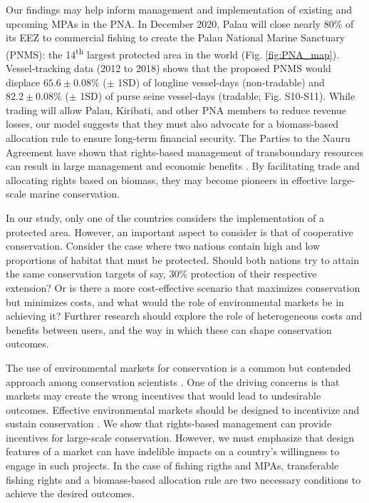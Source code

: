 \documentclass[12pt]{article}
\begin{document}
Our findings may help inform management and implementation of existing and upcoming MPAs in the PNA. In December 2020, Palau will close nearly 80\% of its EEZ to commercial fishing to create the Palau National Marine Sanctuary (PNMS): the 14\textsuperscript{th} largest protected area in the world (Fig. \ref{fig:PNA_map}). Vessel-tracking data (2012 to 2018) shows that the proposed PNMS would displace $65.6 \pm 0.08$\% ($\pm$ 1SD) of longline vessel-days (non-tradable) and $82.2 \pm 0.08$\% ($\pm$ 1SD) of purse seine vessel-days (tradable; Fig. S10-S11). While trading will allow Palau, Kiribati, and other PNA members to reduce revenue losses, our model suggests that they must also advocate for a biomass-based allocation rule to ensure long-term financial security. The Parties to the Nauru Agreement have shown that rights-based management of transboundary resources can result in large management and economic benefits \cite{havice_2013,aqorau_2018}. By facilitating trade and allocating rights based on biomass, they may become pioneers in effective large-scale marine conservation.

In our study, only one of the countries considers the implementation of a protected area. However, an important aspect to consider is that of cooperative conservation. Consider the case where two nations contain high and low proportions of habitat that must be protected. Should both nations try to attain the same conservation targets of say, 30\% protection of their respective extension? Or is there a more cost-effective scenario that maximizes conservation but minimizes costs, and what would the role of environmental markets be in achieving it? Furthrer research should explore the role of heterogeneous costs and benefits between users, and the way in which these can shape conservation outcomes.

The use of environmental markets for conservation is a common but contended approach among conservation scientists \cite{sandbrook_2019}. One of the driving concerns is that markets may create the wrong incentives that would lead to undesirable outcomes. Effective environmental markets should be designed to incentivize and sustain conservation \cite{adams_2014}. We show that rights-based management can provide incentives for large-scale conservation. However, we must emphasize that design features of a market can have indelible impacts on a country’s willingness to engage in such projects. In the case of fishing rigths and MPAs, transferable fishing rights and a biomass-based allocation rule are two necessary conditions to achieve the desired outcomes.
\end{document}
